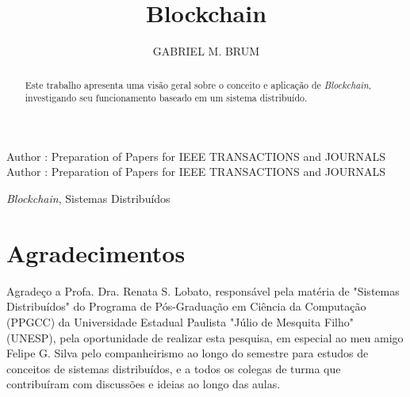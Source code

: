 \documentclass{ieeeaccess}
\begin{document}

\title{Blockchain}
\author{\uppercase{Gabriel M. Brum}}
\address[1]{Instituto de Biociências Letras e Ciências Exatas (IBILCE), São José do Rio Preto - SP, Brasil (e-mail: g.brum@unesp.br)}

\markboth
{Author \headeretal: Preparation of Papers for IEEE TRANSACTIONS and JOURNALS}
{Author \headeretal: Preparation of Papers for IEEE TRANSACTIONS and JOURNALS}


\begin{abstract}
Este trabalho apresenta uma visão geral sobre o conceito e aplicação de \textit{Blockchain}, investigando seu funcionamento baseado em um sistema distribuído. \lipsum[1]
\end{abstract}

\begin{keywords}
\textit{Blockchain}, Sistemas Distribuídos
\end{keywords}

\titlepgskip=-15pt

\maketitle









\section*{Agradecimentos}

Agradeço a Profa. Dra. Renata S. Lobato, responsável pela matéria de "Sistemas Distribuídos" do Programa de Pós-Graduação em Ciência da Computação (PPGCC) da Universidade Estadual Paulista "Júlio de Mesquita Filho" (UNESP), pela oportunidade de realizar esta pesquisa, em especial ao meu amigo Felipe G. Silva pelo companheirismo ao longo do semestre para estudos de conceitos de sistemas distribuídos, e a todos os colegas de turma que contribuíram com discussões e ideias ao longo das aulas.




\EOD
\end{document}
